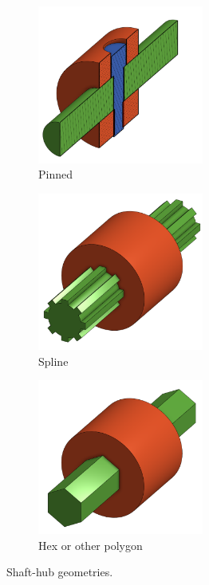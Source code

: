 \documentclass[10pt,letterpaper]{book}
\begin{document}
\begin{figure}[H]
\begin{subfigure}[b]{.32\linewidth}
			\includegraphics[width=0.6\textwidth]{imgs/pinnedshaft.png}
			\caption{Pinned}
		\end{subfigure}
		\begin{subfigure}[b]{.32\linewidth}
			\includegraphics[width=0.6\textwidth]{imgs/splineshaft.png}
			\caption{Spline}
		\end{subfigure}
		\begin{subfigure}[b]{.32\linewidth}
			\includegraphics[width=0.6\textwidth]{imgs/hexshaft.png}
			\caption{Hex or other polygon}
		\end{subfigure}
		
		\caption{Shaft-hub geometries.}
	\end{figure}
	
\end{document}
